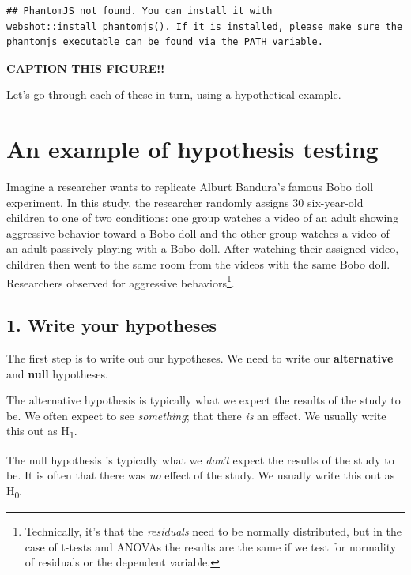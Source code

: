 \documentclass[
]{book}
\begin{document}
\begin{verbatim}
## PhantomJS not found. You can install it with webshot::install_phantomjs(). If it is installed, please make sure the phantomjs executable can be found via the PATH variable.
\end{verbatim}

\label{fig:unnamed-chunk-1}\textbf{CAPTION THIS FIGURE!!}

Let's go through each of these in turn, using a hypothetical example.

\hypertarget{an-example-of-hypothesis-testing}{%
\section{An example of hypothesis testing}\label{an-example-of-hypothesis-testing}}

Imagine a researcher wants to replicate Alburt Bandura's famous Bobo doll experiment. In this study, the researcher randomly assigns 30 six-year-old children to one of two conditions: one group watches a video of an adult showing aggressive behavior toward a Bobo doll and the other group watches a video of an adult passively playing with a Bobo doll. After watching their assigned video, children then went to the same room from the videos with the same Bobo doll. Researchers observed for aggressive behaviors\footnote{Technically, it's that the \emph{residuals} need to be normally distributed, but in the case of t-tests and ANOVAs the results are the same if we test for normality of residuals or the dependent variable.}.

\hypertarget{write-your-hypotheses}{%
\subsection{1. Write your hypotheses}\label{write-your-hypotheses}}

The first step is to write out our hypotheses. We need to write our \textbf{alternative} and \textbf{null} hypotheses.

The alternative hypothesis is typically what we expect the results of the study to be. We often expect to see \emph{something}; that there \emph{is} an effect. We usually write this out as H\textsubscript{1}.

The null hypothesis is typically what we \emph{don't} expect the results of the study to be. It is often that there was \emph{no} effect of the study. We usually write this out as H\textsubscript{0}.
\end{document}
